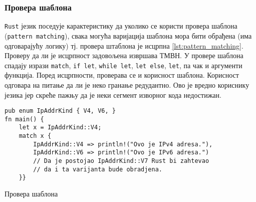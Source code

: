 \subsubsection{Провера шаблона}
\verb|Rust| језик поседује карактеристику да уколико се користи провера шаблона (\verb|pattern matching|), свака могућа 
варијација шаблона мора бити обрађена (има одговарајућу логику) тј. провера штаблона је исцрпна \ref{lst:pattern_matching}.
Проверу да ли је исцрпност задовољена извршава ТМВН. У провере шаблона спадају изрази \verb|match|, \verb|if let|, \verb|while let|,
\verb|let else|, \verb|let|, па чак и аргументи функција. Поред исцрпности, проверава се и корисност шаблона. Корисност одговара на питање 
да ли је неко гранање редудантно. Ово је вредно кориснику језика јер скреће пажњу да је неки сегмент изворног кода недостижан. 

\begin{listing}[H]
\begin{verbatim}
pub enum IpAddrKind { V4, V6, }
fn main() {
    let x = IpAddrKind::V4;
    match x {
        IpAddrKind::V4 => println!("Ovo je IPv4 adresa."), 
        IpAddrKind::V6 => println!("Ovo je IPv6 adresa.") 
        // Da je postojao IpAddrKind::V7 Rust bi zahtevao 
        // da i ta varijanta bude obradjena.
    }}
\end{verbatim}
\caption{Провера шаблона}
\label{lst:pattern_matching}
\end{listing}